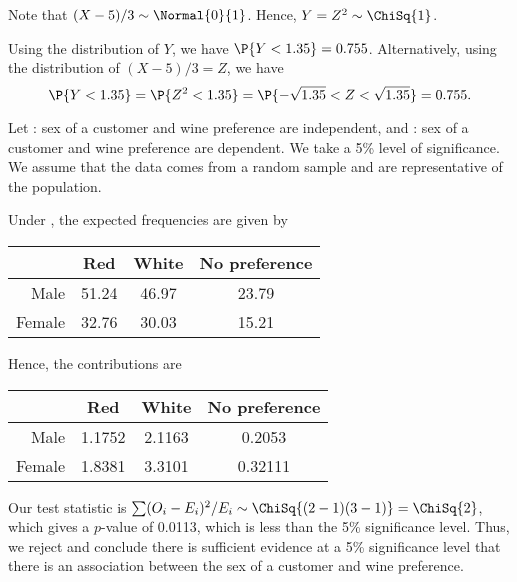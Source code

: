 \begin{solution}
    \begin{ppart}
        Note that $(X-5)/3 \sim \Normal{0}{1}$. Hence, $Y = Z^2 \sim \ChiSq{1}$.

        Using the distribution of $Y$, we have $\P{Y < 1.35} = 0.755$. Alternatively, using the distribution of $(X-5)/3 = Z$, we have \[\P{Y < 1.35} = \P{Z^2 < 1.35} = \P{-\sqrt{1.35} < Z < \sqrt{1.35}} = 0.755.\]
    \end{ppart}
    \begin{ppart}
        Let \nullhyp: sex of a customer and wine preference are independent, and \althyp: sex of a customer and wine preference are dependent. We take a 5\% level of significance. We assume that the data comes from a random sample and are representative of the population.

        Under \nullhyp, the expected frequencies are given by
        \begin{table}[H]
            \centering
            \begin{tabular}{|r|c|c|c|}
            \hline
             & Red & White & No preference \\ \hline
            Male & 51.24 & 46.97 & 23.79\\ \hline
            Female & 32.76 & 30.03 & 15.21 \\ \hline
            \end{tabular}
        \end{table}
        Hence, the contributions are
        \begin{table}[H]
            \centering
            \begin{tabular}{|r|c|c|c|}
            \hline
             & Red & White & No preference \\ \hline
            Male & 1.1752 & 2.1163 & 0.2053 \\ \hline
            Female & 1.8381 & 3.3101 & 0.32111 \\ \hline
            \end{tabular}
        \end{table}
        Our test statistic is $\sum (O_i - E_i)^2/E_i \sim \ChiSq{(2-1)(3-1)} = \ChiSq{2}$, which gives a $p$-value of 0.0113, which is less than the 5\% significance level. Thus, we reject \nullhyp{} and conclude there is sufficient evidence at a 5\% significance level that there is an association between the sex of a customer and wine preference.
    \end{ppart}
\end{solution}

